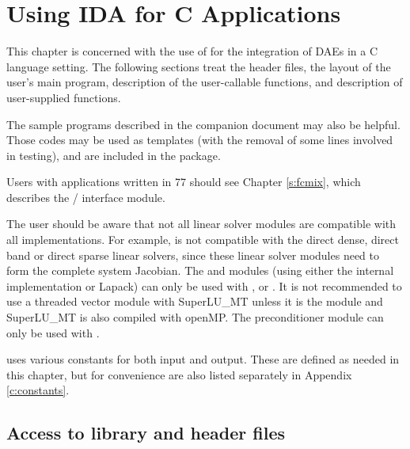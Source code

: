 \chapter{Using IDA for C Applications}\label{s:simulation}

This chapter is concerned with the use of {\ida} for the integration
of DAEs in a C language setting.  The following sections treat the header files,
the layout of the user's main program, description of the {\ida} user-callable
functions, and description of user-supplied functions.

The sample programs described in the companion document \cite{ida_ex} 
may also be helpful. Those codes may be used as templates (with the removal of
some lines involved in testing), and are included in the {\ida} package.

Users with applications written in {\F}77 should see Chapter \ref{s:fcmix},
which describes the {\F}/{\C} interface module.

The user should be aware that not all linear solver modules are compatible 
with all {\nvector} implementations. 
For example, {\nvecp} is not compatible with the direct dense, direct
band or direct sparse linear solvers, since these linear solver modules 
need to form the complete system Jacobian.  The {\idadense} and
{\idaband} modules (using either the internal implementation or
Lapack) can only be used with {\nvecs}, {\nvecopenmp} or {\nvecpthreads}. 
It is not recommended to use a threaded vector module with SuperLU\_MT
unless it is the {\nvecopenmp} module and SuperLU\_MT is also compiled
with openMP.
The preconditioner module {\idabbdpre} can only be used with {\nvecp}. 

{\ida} uses various constants for both input and output.  These are
defined as needed in this chapter, but for convenience are also listed
separately in Appendix \ref{c:constants}.

\section{Access to library and header files}\label{ss:file_access}

